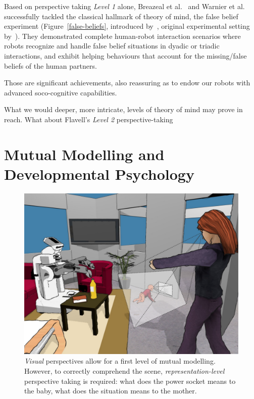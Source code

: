 \documentclass{sig-alternate}
\begin{document}
Based on perspective taking \emph{Level 1} alone, Breazeal et
al.~\cite{breazeal2009embodied} and Warnier et al.~\cite{warnier2012when}
successfully tackled the classical hallmark of theory of mind, the false belief
experiment (Figure~\ref{false-beliefs}, introduced by~\cite{wimmer1983beliefs},
original experimental setting by~\cite{baron1985does}). They demonstrated
complete human-robot interaction scenarios where robots recognize and handle
false belief situations in dyadic or triadic interactions, and exhibit helping
behaviours that account for the missing/false beliefs of the human partners.

Those are significant achievements, also reassuring as to endow our robots with
advanced soco-cognitive capabilities.

What we would
deeper, more
intricate, levels of theory of mind may prove in reach. What about Flavell's
\emph{Level 2} perspective-taking

\section{Mutual Modelling and Developmental Psychology}

\begin{figure}
        \centering
        \includegraphics[width=0.9\columnwidth]{representation-perspective-taking}
        \caption{\emph{Visual} perspectives allow for a first level of mutual
            modelling. However, to correctly comprehend the scene,
            \emph{representation-level} perspective taking is required: what
            does the power socket means to the baby, what does the situation
            means to the mother.}

        \label{representation-level}
\end{figure}
\end{document}
